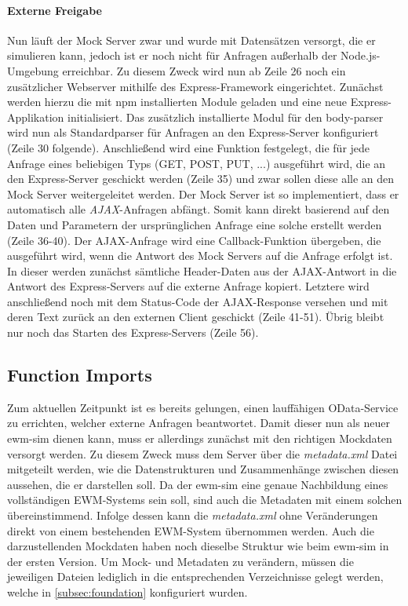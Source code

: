 \paragraph{Externe Freigabe}
Nun läuft der Mock Server zwar und wurde mit Datensätzen versorgt, die er simulieren kann, jedoch ist er noch nicht für Anfragen außerhalb der Node.js-Umgebung erreichbar.
Zu diesem Zweck wird nun ab Zeile 26 noch ein zusätzlicher Webserver mithilfe des Express-Framework eingerichtet.
Zunächst werden hierzu die mit \ac{npm} installierten Module geladen und eine neue Express-Applikation initialisiert.
Das zusätzlich installierte Modul für den body-parser wird nun als Standardparser für Anfragen an den Express-Server konfiguriert (Zeile 30 folgende).
Anschließend wird eine Funktion festgelegt, die für jede Anfrage eines beliebigen Typs (GET, POST, PUT, ...) ausgeführt wird, die an den Express-Server geschickt werden (Zeile 35) und zwar sollen diese alle an den Mock Server weitergeleitet werden.
Der Mock Server ist so implementiert, dass er automatisch alle \emph{\ac{AJAX}}-Anfragen abfängt.
Somit kann direkt basierend auf den Daten und Parametern der ursprünglichen Anfrage eine solche erstellt werden (Zeile 36-40).
Der \ac{AJAX}-Anfrage wird eine Callback-Funktion übergeben, die ausgeführt wird, wenn die Antwort des Mock Servers auf die Anfrage erfolgt ist.
In dieser werden zunächst sämtliche Header-Daten aus der \ac{AJAX}-Antwort in die Antwort des Express-Servers auf die externe Anfrage kopiert.
Letztere wird anschließend noch mit dem Status-Code der \ac{AJAX}-Response versehen und mit deren Text zurück an den externen Client geschickt (Zeile 41-51).
Übrig bleibt nur noch das Starten des Express-Servers (Zeile 56).


\subsection{Function Imports}
Zum aktuellen Zeitpunkt ist es bereits gelungen, einen lauffähigen \ac{OData}-Service zu errichten, welcher externe Anfragen beantwortet.
Damit dieser nun als neuer \ac{ewm-sim} dienen kann, muss er allerdings zunächst mit den richtigen Mockdaten versorgt werden.
Zu diesem Zweck muss dem Server über die \emph{metadata.xml} Datei mitgeteilt werden, wie die Datenstrukturen und Zusammenhänge zwischen diesen aussehen, die er darstellen soll.
Da der \ac{ewm-sim} eine genaue Nachbildung eines vollständigen \ac{EWM}-Systems sein soll, sind auch die Metadaten mit einem solchen übereinstimmend.
Infolge dessen kann die \emph{metadata.xml} ohne Veränderungen direkt von einem bestehenden \ac{EWM}-System übernommen werden.
Auch die darzustellenden Mockdaten haben noch dieselbe Struktur wie beim \ac{ewm-sim} in der ersten Version.
Um Mock- und Metadaten zu verändern, müssen die jeweiligen Dateien lediglich in die entsprechenden Verzeichnisse gelegt werden, welche in \autoref{subsec:foundation} konfiguriert wurden.

